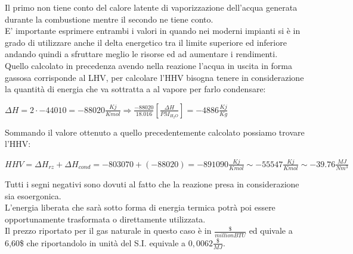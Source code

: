 \smallskip
\noindent
Il primo non tiene conto del calore latente di vaporizzazione dell'acqua generata durante la combustione mentre il secondo ne tiene conto.\\
E' importante esprimere entrambi i valori in quando nei moderni impianti si è in grado di utilizzare anche il delta energetico tra il limite superiore ed inferiore andando quindi a sfruttare meglio le risorse ed ad aumentare i rendimenti.\\
Quello calcolato in precedenza avendo nella reazione l'acqua in uscita in forma gassosa corrisponde al LHV, per calcolare l'HHV bisogna tenere in considerazione la quantità di energia che va sottratta a al vapore per farlo condensare:
\begin{center}
    \large{$\Delta H = 2 \cdot -44010 = -88020 \frac{Kj}{Kmol} \Rightarrow \frac{-88020}{18.016}[\frac{\Delta H}{PM_{H_2O}}] = -4886 \frac{Kj}{Kg}$}
\end{center}
Sommando il valore ottenuto a quello precedentemente calcolato possiamo trovare l'HHV:
\begin{center}
    \normalsize{$HHV = \Delta H_{rz} + \Delta H_{cond} = -803070 + (-88020) = -891090 \frac{Kj}{Kmol}\sim -55547 \frac{Kj}{Kmol} \sim -39.76 \frac{MJ}{Nm^3}$}
\end{center}
Tutti i segni negativi sono dovuti al fatto che la reazione presa in considerazione sia esoergonica.\\
L'energia liberata che sarà sotto forma di energia termica potrà poi essere opportunamente trasformata o direttamente utilizzata.\\
Il prezzo riportato per il gas naturale in questo caso è in $\frac{\$}{million BTU}$ ed quivale a 6,60\$ che riportandolo in unità del S.I. equivale a $0,0062\frac{\$}{MJ}$.\\
\noindent
\newpage
